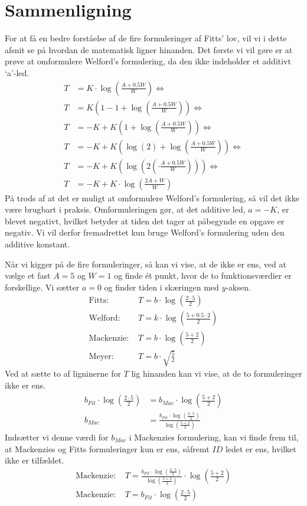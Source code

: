 \section*{Sammenligning}
For at få en bedre forståelse af de fire formuleringer af Fitts' lov, vil vi i dette afsnit se på hvordan de matematisk ligner hinanden. Det første vi vil gøre er at prøve at omformulere Welford's formulering, da den ikke indeholder et additivt `a'-led. 
\begin{align*}
T &= K\cdot\log\left(\frac{A+0.5W}{W}\right)\Leftrightarrow\\
T &= K\left(1-1+\log\left(\frac{A+0.5W}{W}\right)\right)\Leftrightarrow\\
T &= -K+K\left(1+\log\left(\frac{A+0.5W}{W}\right)\right)\Leftrightarrow\\
T &= -K+K\left(\log(2)+\log\left(\frac{A+0.5W}{W}\right)\right)\Leftrightarrow\\
T &= -K+K\left(\log\left(2\left(\cdot\frac{A+0.5W}{W}\right)\right)\right)\Leftrightarrow\\
T &= -K+K\cdot\log\left(\frac{2A+W}{W}\right)
\end{align*}
På trods af at det er muligt at omformulere Welford's formulering, så vil det ikke være brugbart i praksis. Omformuleringen gør, at det additive led, $a = -K$, er blevet negativt, hvilket betyder at tiden det tager at påbegynde en opgave er negativ. Vi vil derfor fremadrettet kun bruge Welford's formulering uden den additive konstant.

Når vi kigger på de fire formuleringer, så kan vi vise, at de ikke er ens, ved at vælge et fast $A = 5$ og $W = 1$ og finde ét punkt, hvor de to funktionsværdier er forskellige. Vi sætter $a=0$ og finder tiden i skæringen med $y$-aksen.
\begin{align*}
\text{Fitts: } &T=b\cdot\log\left(\frac{2\cdot5}{2}\right)\\
\text{Welford: } &T=k\cdot\log\left(\frac{5+0.5\cdot 2}{2}\right)\\
\text{Mackenzie: } &T=b\cdot\log\left(\frac{5 + 2}{2}\right)\\
\text{Meyer: } &T=b\cdot\sqrt{\frac{5}{2}}
\end{align*}
Ved at sætte to af ligninerne for $T$ lig hinanden kan vi vise, at de to formuleringer ikke er ens.
\begin{align*}
b_{Fit}\cdot\log\left(\frac{2\cdot5}{2}\right)&=b_{Mac}\cdot\log\left(\frac{5 + 2}{2}\right)\\
b_{Mac} &= \frac{b_{Fit}\cdot\log\left(\frac{2\cdot5}{2}\right)}{\log\left(\frac{5 + 2}{2}\right)}
\end{align*}
Indsætter vi denne værdi for $b_{Mac}$ i Mackenzies formulering, kan vi finde frem til, at Mackenzies og Fitts formuleringer kun er ens, såfremt $ID$ ledet er ens, hvilket ikke er tilfældet.
\begin{align*}
\text{Mackenzie: } &T =\frac{b_{Fit}\cdot\log\left(\frac{2\cdot5}{2}\right)}{\log\left(\frac{5 + 2}{2}\right)}\cdot\log\left(\frac{5 + 2}{2}\right)\\
\text{Mackenzie: } &T =b_{Fit}\cdot\log\left(\frac{2\cdot5}{2}\right)
\end{align*}

